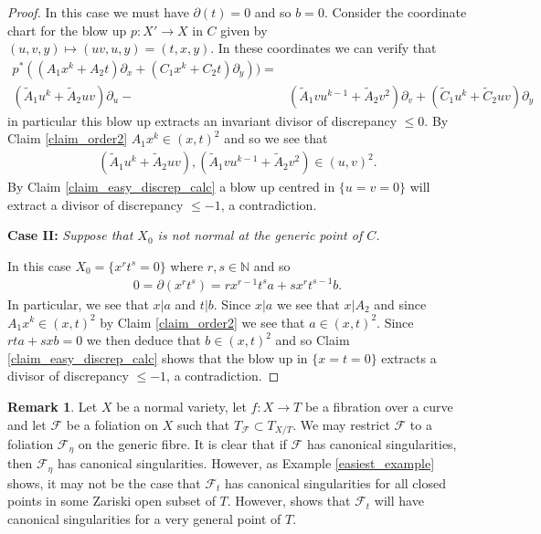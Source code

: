 \documentclass[12pt, a4paper]{amsart}
\theoremstyle{definition}
\newtheorem{remark}[theorem]{Remark}
\theoremstyle{named}
\begin{document}
\begin{proof}
In this case we must have $\partial(t) = 0$ 
and so $b = 0$.
Consider the coordinate chart for the blow up $p\colon X' \rightarrow X$ in $C$ 
given by $(u, v, y) \mapsto (uv, u, y) = (t, x, y)$.
In these coordinates we can verify that 
\begin{align*}p^*((A_1x^k+A_2t)\partial_x+(C_1x^k+C_2t)\partial_y)) =& \\
(\tilde A_1u^k+\tilde A_2uv)\partial_u - &(\tilde A_1vu^{k-1}+\tilde A_2v^2)\partial_v+(\tilde C_1u^k+\tilde C_2uv)\partial_y
\end{align*}
in particular this blow up extracts an invariant divisor 
of discrepancy $\leq 0$.
By Claim \ref{claim_order2} $A_1x^k \in (x, t)^2$ and so 
we see that 
\begin{align*}(\tilde A_1u^k+\tilde A_2uv), (\tilde A_1vu^{k-1}+\tilde A_2v^2)
\in (u, v)^2.\end{align*}  By Claim \ref{claim_easy_discrep_calc} a blow up centred in $\{u = v = 0\}$
will extract a divisor of discrepancy $\leq -1$, a contradiction.


\medskip 

{\bf Case II: }{\it  Suppose that $X_0$ is not normal at the generic point of $C$.}

In this case $X_0 = \{x^rt^s = 0\}$ where $r, s \in \mathbb N$ and so 
\begin{align*}0 = \partial(x^rt^s) = rx^{r-1}t^sa+sx^rt^{s-1}b.\end{align*}
In particular, we see that $x|a$ and $t|b$.
Since $x|a$ we see that $x|A_2$ and since $A_1x^k \in (x, t)^2$ by Claim \ref{claim_order2} we see that $a\in (x, t)^2$.
Since $rta+sxb = 0$ we then deduce that $b \in (x, t)^2$ and so 
Claim \ref{claim_easy_discrep_calc} shows that
the blow up in $\{x = t = 0\}$ extracts a divisor of discrepancy $\le-1$, a contradiction.
\end{proof}


\begin{remark}
\label{rem_very_general_canonical}
    Let $X$ be a normal variety, let $f\colon X \to T$ be a fibration over a curve and let $\mathcal F$ be a foliation on $X$ such that $T_{\mathcal F} \subset T_{X/T}$.  We may restrict $\mathcal F$
 to a foliation $\mathcal F_\eta$ on the generic fibre.  It is clear that if $\mathcal F$ has canonical singularities, then $\mathcal F_\eta$ has canonical singularities.  However, as Example \ref{easiest_example} shows, it may not be the case that $\mathcal F_t$ has canonical singularities for all closed points in some Zariski open subset of $T$.  However, \cite[Fact III.i.3]{MP13} shows that 
 $\mathcal F_t$ will have canonical singularities for a very general point of $T$.
 \end{remark}
\end{document}
